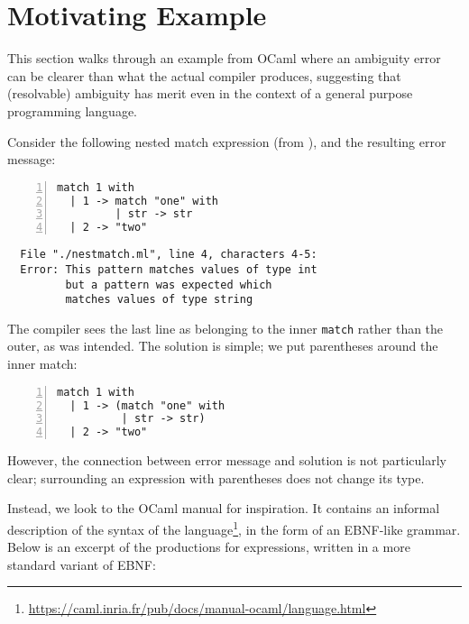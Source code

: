 \documentclass[acmsmall,review,anonymous]{acmart}\settopmatter{printfolios=true,printccs=false,printacmref=false}
\newcommand{\ocaml}{\lstinline[language={[objective]caml}]}
\begin{document}
\section{Motivating Example}

This section walks through an example from OCaml where an ambiguity error can be clearer than what the actual compiler produces, suggesting that (resolvable) ambiguity has merit even in the context of a general purpose programming language.

Consider the following nested match expression (from \cite{palmkvistCreatingDomainSpecificLanguages2019}), and the resulting error message:

\begin{minipage}{.35\textwidth}
\begin{lstlisting}[language={[objective]caml},numbers=left]
match 1 with
  | 1 -> match "one" with
         | str -> str
  | 2 -> "two"
\end{lstlisting}
\end{minipage}
\vrule
\begin{minipage}{\textwidth}
\begin{lstlisting}
  File "./nestmatch.ml", line 4, characters 4-5:
  Error: This pattern matches values of type int
         but a pattern was expected which
         matches values of type string
\end{lstlisting}
\end{minipage}

\noindent The compiler sees the last line as belonging to the inner \ocaml{match} rather than the outer, as was intended. The solution is simple; we put parentheses around the inner match:

\begin{minipage}{\textwidth}
\begin{lstlisting}[language={[objective]caml},numbers=left]
match 1 with
  | 1 -> (match "one" with
          | str -> str)
  | 2 -> "two"
\end{lstlisting}
\end{minipage}

\noindent However, the connection between error message and solution is not particularly clear; surrounding an expression with parentheses does not change its type.

Instead, we look to the OCaml manual for inspiration. It contains an informal description of the syntax of the language\footnote{\url{https://caml.inria.fr/pub/docs/manual-ocaml/language.html}}, in the form of an EBNF-like grammar. Below is an excerpt of the productions for expressions, written in a more standard variant of EBNF:
\end{document}
